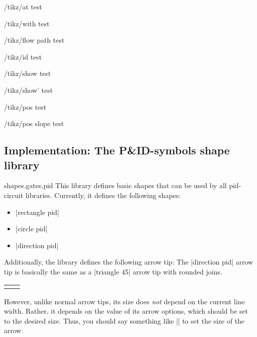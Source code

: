 \documentclass[a4paper]{ltxdoc}
\begin{document}
\begin{key}{/tikz/at}
 test
\end{key}

\begin{key}{/tikz/with}
 test
\end{key}

\begin{decoration}{/tikz/flow path}
 test
 \begin{key}{/tikz/id}
  test
 \end{key}

 \begin{key}{/tikz/show}
  test
 \end{key}

 \begin{key}{/tikz/show'}
  test
 \end{key}

 \begin{key}{/tikz/pos}
  test
 \end{key}

 \begin{key}{/tikz/pos slope}
  test
 \end{key}

\end{decoration}

\subsection{Implementation: The P\&ID-symbols shape library}
\begin{pgflibrary}{shapes.gates.pid}
 This library defines basic shapes that can be used by all pid-circuit
 libraries. Currently, it defines the following shapes:
 \begin{itemize}
  \item |rectangle pid|
  \item |circle pid|
  \item |direction pid|
 \end{itemize}
 Additionally, the library defines the following arrow tip:
 The |direction pid| arrow tip is basically the same as a |triangle 45|
 arrow tip with rounded joins.

 \begin{tabu}{l l}
 \end{tabu}

 However, unlike normal arrow tips, its size does \emph{not} depend on
 the current line width. Rather, it depends on the value of its
 arrow options, which should be set to the desired size. Thus, you
 should say something like || to
 set the size of the arrow.
\end{pgflibrary}
\end{document}
